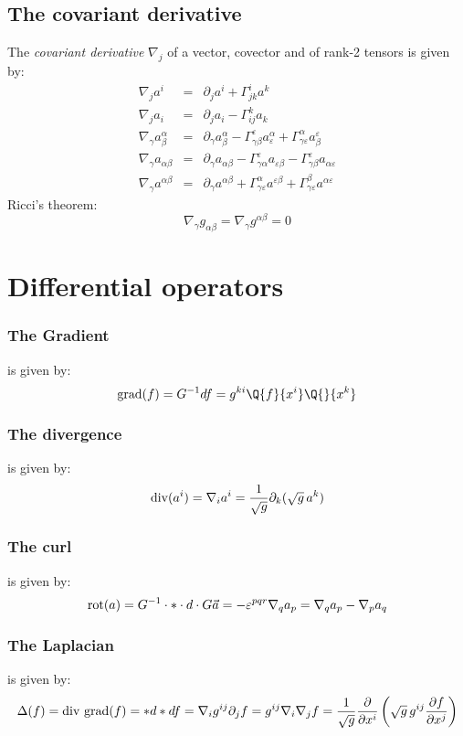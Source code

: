 \subsection{The covariant derivative}
The {\it covariant derivative} $\nabla_j$ of a vector, covector and of
rank-2 tensors is given by:
\begin{eqnarray*}
\nabla_ja^i                  &=&\partial_ja^i+\Gamma^i_{jk}a^k\\
\nabla_ja_i                  &=&\partial_ja_i-\Gamma^k_{ij}a_k\\
\nabla_\gamma a^\alpha_\beta &=&\partial_\gamma a^\alpha_\beta -\Gamma^\varepsilon_{\gamma\beta} a^\alpha_\varepsilon+\Gamma^\alpha_{\gamma\varepsilon}a_\beta^\varepsilon\\
\nabla_\gamma a_{\alpha\beta}&=&\partial_\gamma a_{\alpha\beta}-\Gamma^\varepsilon_{\gamma\alpha}a_{\varepsilon\beta}-\Gamma^\varepsilon_{\gamma\beta}a_{\alpha\varepsilon}\\
\nabla_\gamma a^{\alpha\beta}&=&\partial_\gamma a^{\alpha\beta}+\Gamma^\alpha_{\gamma\varepsilon}a^{\varepsilon\beta}+\Gamma^\beta_{\gamma\varepsilon}a^{\alpha\varepsilon}
\end{eqnarray*}
Ricci's theorem:
\[
\nabla_\gamma g_{\alpha\beta}=\nabla_\gamma g^{\alpha\beta}=0
\]

\section{Differential operators}
\subsubsection{The Gradient}
is given by:
\[
{\rm grad}(f)=G^{-1}df=g^{ki}\Q{f}{x^i}\Q{}{x^k}
\]

\subsubsection{The divergence}
is given by:
\[
{\rm div}(a^i)=\nabla_ia^i=\frac{1}{\sqrt{g}}\partial_k(\sqrt{g}\,a^k)
\]

\subsubsection{The curl}
is given by:
\[
{\rm rot}(a)=G^{-1}\cdot*\cdot d\cdot G\vec{a}=-\varepsilon^{pqr}\nabla_qa_p=\nabla_qa_p-\nabla_pa_q
\]

\subsubsection{The Laplacian}
is given by:
\[
\Delta(f)={\rm div~grad}(f)=*d*df=\nabla_ig^{ij}\partial_jf=g^{ij}\nabla_i\nabla_jf=
\frac{1}{\sqrt{g}}\frac{\partial}{\partial x^i}\left(\sqrt{g}\,g^{ij}\frac{\partial f}{\partial x^j}\right)
\]

